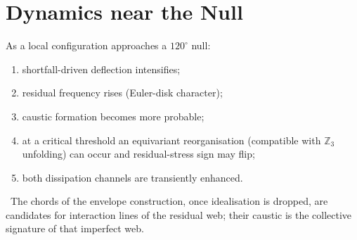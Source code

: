 \section{Dynamics near the Null}
\label{sec:dynamics}

As a local configuration approaches a $120^\circ$ null:
\begin{enumerate}
\item shortfall-driven deflection intensifies;
\item residual frequency rises (Euler-disk character);
\item caustic formation becomes more probable;
\item at a critical threshold an equivariant reorganisation
(compatible with $\mathbb{Z}_3$ unfolding) can occur and residual-stress sign may flip;
\item both dissipation channels are transiently enhanced.
\end{enumerate}
\conceptual\ The chords of the envelope construction, once idealisation is dropped,
are candidates for interaction lines of the residual web; their caustic is the
collective signature of that imperfect web.
